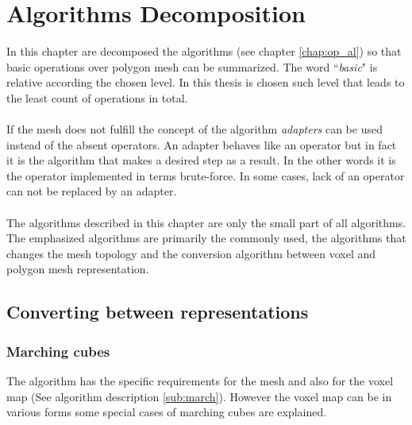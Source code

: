\chapter{Algorithms Decomposition}

In this chapter are decomposed the algorithms (see chapter \ref{chap:op_al}) so that basic
operations over polygon
mesh can be summarized. The word ``\emph{basic}" is relative according the chosen level.
In this thesis is chosen such level that leads to the least count of operations in total.\\
\\
If the mesh does not fulfill the concept of the algorithm \emph{adapters} can be used instead
of the absent operators. An adapter behaves like an operator but in fact it is the algorithm that
makes a desired step as a result. In the other words it is the operator implemented in terms
brute-force. In some cases, lack of an operator can not be replaced by an adapter.\\
\\
The algorithms described in this chapter are only the small part of all algorithms. The emphasized
algorithms are primarily the commonly used, the algorithms that changes the mesh topology and
the conversion algorithm between voxel and polygon mesh representation.

\section{Converting between representations}

\subsection{Marching cubes}

The algorithm has the specific requirements for the mesh and also for the voxel map (See algorithm
description \ref{sub:march}). However the voxel map can be in various forms some special cases
of marching cubes are explained.

